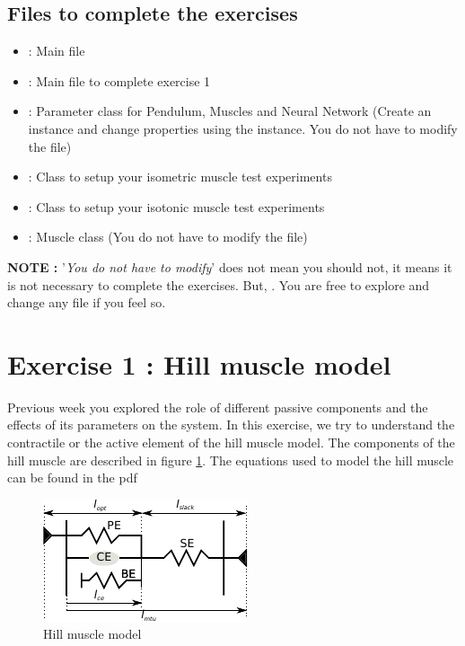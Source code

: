 \documentclass{cmc}
\begin{document}
\subsection*{Files to complete the exercises}
\label{sec:intro}

\begin{itemize}
\item {} : Main file
\item {} : Main file to complete exercise 1
\item {} : Parameter class for Pendulum,
  Muscles and Neural Network (Create an instance and change properties
  using the instance. You do not have to modify the file)
\item {} : Class to setup your
  isometric muscle test experiments
\item {} : Class to setup your
  isotonic muscle test experiments
\item {} : Muscle class (You do not have to modify
  the file)
\end{itemize}

\textbf{NOTE : } '\textit{You do not have to modify}' does not mean
you should not, it means it is not necessary to complete the
exercises. But, . You are free to explore
and change any file if you feel so.


\section*{Exercise 1 : Hill muscle model}
\label{sec:question-2}

Previous week you explored the role of different passive components
and the effects of its parameters on the system. In this exercise, we
try to understand the contractile or the active element of the hill
muscle model. The components of the hill muscle are described in
figure \ref{fig:hill_muscle}. The equations used to model the hill
muscle can be found in the pdf 

\begin{figure}[H]
  \centering \includegraphics[scale=2.5]{figures/hill_muscle}
  \caption{Hill muscle model}
  \label{fig:hill_muscle}
\end{figure}
\end{document}
